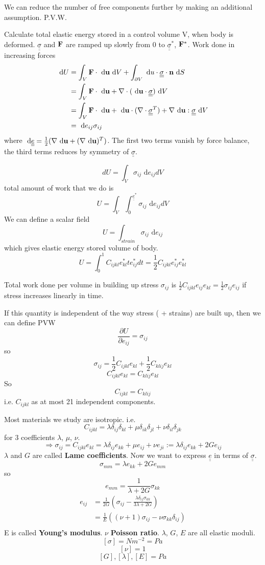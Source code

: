 \documentclass[12pt]{article}
\newcommand{\nn}{{\bf n}}
\newcommand{\uu}{{\bf u}}
\newcommand{\FF}{{\bf F}}
\newcommand{\ssigma}{{\underline{\underline \sigma}}}
\newcommand{\te}{{\underline{\underline e}}}
\newcommand{\dx}[1]{\text{ d}#1}
\begin{document}
We can reduce the number of free components further by making an additional assumption. P.V.W.

Calculate total elastic energy stored in a control volume V, when body is deformed. $\ssigma$ and $\FF$ are ramped up slowly from 0 to $\ssigma^*$, $\FF^*$. Work done in increasing forces 
\begin{align*}
\dx{U} &= \int_V \FF\cdot\dx{\uu} \dx{V} + \int_{\partial V} \dx{u}\cdot \ssigma\cdot\nn\dx{S}\\
&= \int_V \FF\cdot\dx{\uu} + \nabla\cdot (\dx{\uu}\cdot \ssigma) \dx{V} \\
&= \int_V \FF\cdot\dx{\uu} + \dx{\uu}\cdot(\nabla\cdot\ssigma^T) + \nabla\dx{\uu}:\ssigma\dx{V}\\
&= \dx{e_{ij}}\sigma_{ij} 
\end{align*}
where $\dx{\te} = \frac 1 2 (\nabla\dx{\uu} + (\nabla\dx{\uu} )^T)$. The first two terms vanish by force balance, the third terms reduces by symmetry of $\ssigma$.

\[
dU = \int_V\sigma_{ij}\dx{e_{ij}}dV
\]
total amount of work that we do is 
\[
U = \int_V\int_0^{\te^*}\sigma_{ij}\dx{e_{ij}}dV
\]
We can define a scalar field 
\[
U = \int_{strain} \sigma_{ij}\dx{e_{ij}}
\]
which gives elastic energy stored volume of body.
\[
U = \int_0^1C_{ijkl}e_{kl}^*te_{ij}^*dt = \frac 1 2 C_{ijkl}e_{ij}^*e_{kl}^*
\]

Total work done per volume in building up stress $\sigma_{ij}$ is $\frac 1 2 C_{ijkl}e_{ij}e_{kl} = \frac 1 2 \sigma_{ij}e_{ij}$ if stress increases linearly in time.

If this quantity is independent of the way stress ( + strains) are built up, then we can define PVW
\[
\frac{\partial U}{\partial e_{ij}} = \sigma_{ij}
\]
so
\[
\sigma_{ij} = \frac 1 2 C_{ijkl}e_{kl} + \frac 1 2 C_{klij}e_{kl}
\]
\[
C_{ijkl}e_{kl} = C_{klij}e_{kl}
\]
So
\[
C_{ijkl} = C_{klij}
\]
i.e. $C_{ijkl}$ as at most 21 independent components.

Most materials we study are isotropic. i.e.
\[
C_{ijkl} = \lambda \delta_{ij}\delta_{kl} + \mu \delta_{ik}\delta_{jl}  + \nu \delta_{il}\delta_{jk}
\]
for 3 coefficients $\lambda$, $\mu$, $\nu$.
\[
\Rightarrow \sigma_{ij}  = C_{ijkl}e_{kl} = \lambda \delta_{ij}e_{kk} + \mu e_{ij} + \nu e_{ji} := \lambda\delta_{ij}e_{kk} + 2Ge_{ij}
\]
$\lambda$ and $G$ are called {\bf Lame coefficients}. Now we want to express $\te$ in terms of $\ssigma$. 
\[
\sigma_{mm} = \lambda e_{kk} + 2G e_{mm}
\]
so
\[
e_{mm} = \frac {1}{\lambda + 2G} \sigma_{kk}
\]
\begin{align*}
e_{ij} &= \frac{1}{2G} (\sigma_{ij} - \frac{\lambda\delta_{ij}\sigma_{kk}}{3\lambda+ 2 G})\\
	&= \frac1 E ((\nu+1)\sigma_{ij} -\nu \sigma_{kk}\delta_{ij})\\
\end{align*}
E is called {\bf Young's modulus}.
$\nu$ {\bf Poisson ratio}.
$\lambda$, $G$, $E$ are all elastic moduli.
\[
[\sigma] = Nm^{-2} = Pa
\]
\[
[\nu] = 1
\]
\[
[G], [\lambda], [E]= Pa
\]
\end{document}
